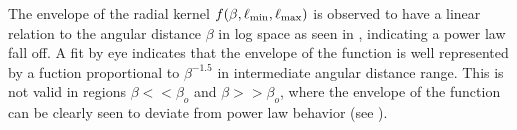 The envelope of the radial kernel $f(\beta,\ell_{\rm min},\ell_{\rm max})$ is observed to have a linear relation to the angular distance $\beta$ in log space as seen in , indicating a power law fall off. A fit by eye indicates that the envelope of the function is well represented by a fuction proportional to $\beta^{-1.5}$ in intermediate angular distance range. This is not valid in regions $\beta << \beta_o$ and $\beta >> \beta_o$, where the envelope of the function can be clearly seen to deviate from power law behavior (see ).


